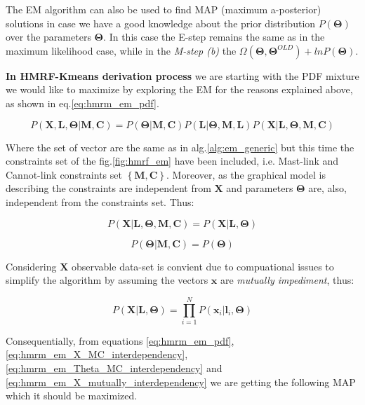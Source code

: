 \documentclass[dvips,dvipdfm,pdftex]{llncs}
\begin{document}
The EM algorithm can also be used to find MAP (maximum a-posterior) solutions in case we have a good knowledge about the prior distribution $P(\mathbf{\Theta})$ over the parameters $\mathbf{\Theta}$. In this case the E-step remains the same as in the maximum likelihood case, while in the \emph{M-step (b)} the $\Omega(\mathbf{\Theta},\mathbf{\Theta}^{OLD})+lnP(\mathbf{\Theta})$.

\textbf{In HMRF-Kmeans derivation process} we are starting with the PDF mixture we would like to maximize by exploring the EM for the reasons explained above, as shown in eq.\ref{eq:hmrm_em_pdf}.

\begin{equation}
	P(\mathbf{X,L,\Theta}|\mathbf{M,C})=P(\mathbf{\Theta}|\mathbf{M,C})P(\mathbf{L}|\mathbf{\Theta,M,L})P(\mathbf{X}|\mathbf{L,\Theta,M,C})
\label{eq:hmrm_em_pdf}
\end{equation}

Where the set of vector are the same as in alg.\ref{alg:em_generic} but this time the constraints set of the fig.\ref{fig:hmrf_em} have been included, i.e. Mast-link and Cannot-link constraints set $\left\{\mathbf{M,C}\right\}$. Moreover, as the graphical model is describing the constraints are independent from $\mathbf{X}$ and parameters $\mathbf{\Theta}$ are, also, independent from the constraints set. Thus:

\begin{equation}
	P(\mathbf{X}|\mathbf{L,\Theta,M,C})=P(\mathbf{X}|\mathbf{L,\Theta})
\label{eq:hmrm_em_X_MC_interdependency}
\end{equation}

\begin{equation}
	P(\mathbf{\Theta}|\mathbf{M,C})=P(\mathbf{\Theta})
\label{eq:hmrm_em_Theta_MC_interdependency}
\end{equation}

Considering $\mathbf{X}$ observable data-set is convient due to compuational issues to simplify the algorithm by assuming the vectors $\mathbf{x}$ are \emph{mutually impediment}, thus:

\begin{equation}
	P(\mathbf{X}|\mathbf{L,\Theta})=\prod_{i=1}^{N}P(\mathbf{x}_{i}|\mathbf{l}_{i},\mathbf{\Theta})
\label{eq:hmrm_em_X_mutually_interdependency}
\end{equation}

Consequentially, from equations \ref{eq:hmrm_em_pdf}, \ref{eq:hmrm_em_X_MC_interdependency}, \ref{eq:hmrm_em_Theta_MC_interdependency} and \ref{eq:hmrm_em_X_mutually_interdependency} we are getting the following MAP which it should be maximized.
\end{document}

